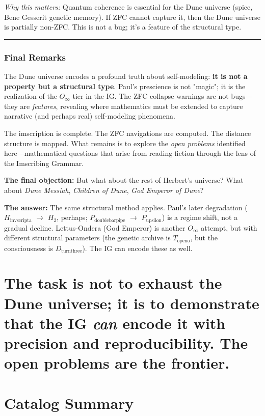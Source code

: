 \documentclass[12pt,a4paper]{article}
\begin{document}
\emph{Why this matters:} Quantum coherence is essential for the Dune universe (spice, Bene Gesserit genetic memory). If ZFC cannot capture it, then the Dune universe is partially non-ZFC. This is not a bug; it's a feature of the structural type.

\begin{center}
\rule{0.5\textwidth}{0.4pt}
\end{center}

\section{Final Remarks}

The Dune universe encodes a profound truth about self-modeling: \textbf{it is not a property but a structural type}. Paul's prescience is not "magic"; it is the realization of the $O_{\infty}$ tier in the IG. The ZFC collapse warnings are not bugs---they are \emph{features}, revealing where mathematics must be extended to capture narrative (and perhaps real) self-modeling phenomena.

The imscription is complete. The ZFC navigations are computed. The distance structure is mapped. What remains is to explore the \emph{open problems} identified here---mathematical questions that arise from reading fiction through the lens of the Imscribing Grammar.

\textbf{The final objection:} But what about the rest of Herbert's universe? What about \emph{Dune Messiah}, \emph{Children of Dune}, \emph{God Emperor of Dune}?

\textbf{The answer:} The same structural method applies. Paul's later degradation ($H_{\text{invscripta}}$ $\rightarrow$ $H_2$, perhaps; $P_{\text{doublebarpipe}}$ $\rightarrow$ $P_{\text{upsilon}}$) is a regime shift, not a gradual decline. Lettus-Ondera (God Emperor) is another $O_{\infty}$ attempt, but with different structural parameters (the genetic archive is $T_{\text{openo}}$, but the consciousness is $D_{\text{turnthree}}$). The IG can encode these as well.

\part{The task is not to exhaust the Dune universe; it is to demonstrate that the IG \emph{can} encode it with precision and reproducibility. The open problems are the frontier.}

\part{Catalog Summary}
\end{document}
